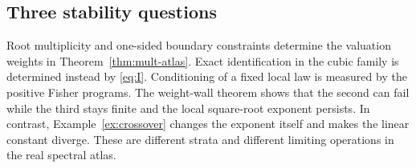 \subsection*{Three stability questions}
Root multiplicity and one-sided boundary constraints determine the
valuation weights in Theorem~\ref{thm:mult-atlas}. Exact identification
in the cubic family is determined instead by \eqref{eq:I}. Conditioning
of a fixed local law is measured by the positive Fisher programs.
The weight-wall theorem shows that the second can fail while the third
stays finite and the local square-root exponent persists. In contrast,
Example~\ref{ex:crossover} changes the exponent itself and makes the
linear constant diverge. These are different strata and different
limiting operations in the real spectral atlas.
